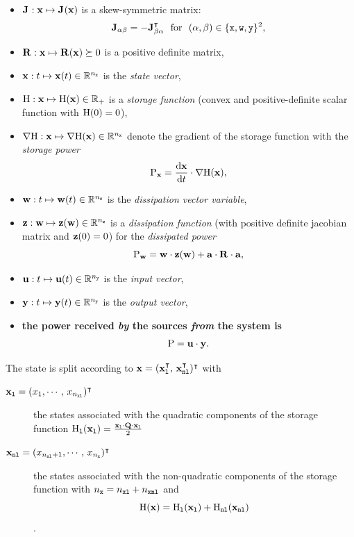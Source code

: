 \documentclass[10pt,a4paper]{article}
\begin{document}
\begin{itemize}
\item $\J{}:\vx \mapsto \J{}(\vx)$ is a skew-symmetric matrix: $$\J{\alpha\beta}=-\J{\beta\alpha}^\T \mbox{~~for~~} (\alpha, \beta)\in\{\lab x, \lab w, \lab y\}^2,$$
\item $\R{}:\vx \mapsto \R{}(\vx)\succeq 0$ is a positive definite matrix,
\item $\vx: t \mapsto \vx(t)\in\RR^{\nx}$ is the \emph{state vector},
\item $\H:\vx \mapsto \H(\vx)\in \RR_+$ is a \emph{storage function} (convex and positive-definite scalar function with $\H(0)=0$),
\item $\nabla\H:\vx\mapsto\nabla \H(\vx)\in\RR^{\nx}$ denote the gradient of the storage function with the \emph{storage power} $$\op P_\vx = \D{\vx}{t}\cdot \nabla\H(\vx),$$
\item $\vw: t \mapsto \vw(t)\in\RR^{\nw}$ is the \emph{dissipation vector variable},
\item $\vz:\vw \mapsto \vz(\vw)\in \RR^{\nw}$ is a \emph{dissipation function} (with positive definite jacobian matrix and $\vz(0)=0$) for the \emph{dissipated power} $$\op P_\vw = \vw\cdot \vz(\vw) + \vec a\cdot\R{}\cdot\vec a,$$
\item $\vu: t \mapsto \vu(t)\in\RR^{\ny}$ is the \emph{input vector},
\item $\vy: t \mapsto \vy(t)\in\RR^{\ny}$ is the \emph{output vector},
\item  \textbf{the power received \emph{by} the sources \emph{from} the system is} $$\op P=\vu\cdot\vy.$$
\end{itemize}
%

The state is split according to $\vx=(\vxl^\T, \,\vxnl^\T)^\T $ with 
%

\begin{description}
%
\item[$\vxl = (x_1,\cdots,\,x_\nxl)^\T$] the states associated with the quadratic components of the storage function $\Hl(\vxl)=\frac{\vxl\cdot\Q\cdot\vxl}{2}$
%
\item[$\vxnl=(x_{\nxl+1},\cdots,\,x_\nx)^\T$] the states associated with the non-quadratic components of the storage function with $\nx = \nxl+\nxnl$ and $$\H(\vx) = \Hl(\vxl) + \Hnl(\vxnl)$$.\\
%
\end{description}
%
\end{document}
